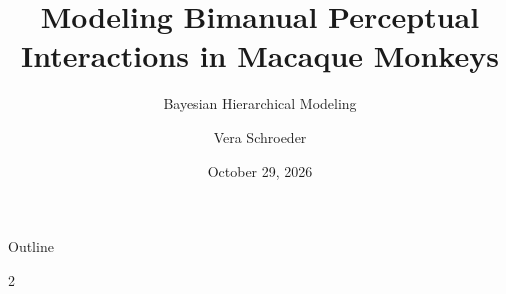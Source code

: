 \documentclass[aspectratio=169,11pt]{beamer}
\title{Modeling Bimanual Perceptual Interactions in Macaque Monkeys}
\subtitle{Bayesian Hierarchical Modeling}
\author{Vera Schroeder}
\date{October 29, 2026}
\begin{document}
\begin{frame}
  \titlepage
\end{frame}

\begin{frame}{Outline}
  \small
  \begin{multicols}{2}
    \tableofcontents
  \end{multicols}
\end{frame}








\appendix
\end{document}
